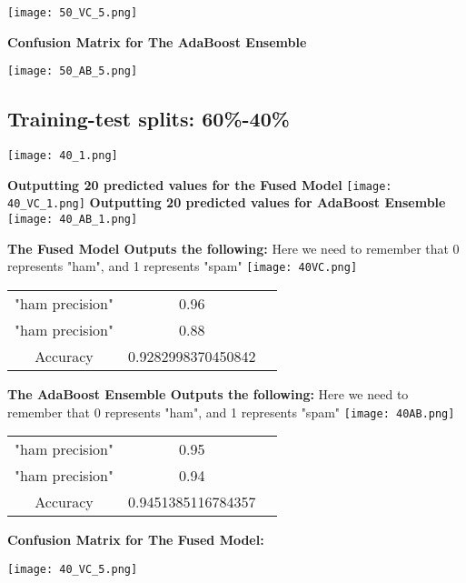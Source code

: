 \documentclass{article}
\begin{document}
\centering
\texttt{[image: 50\_VC\_5.png]}
\centering

\textbf{Confusion Matrix for The AdaBoost Ensemble}
\centering
\vspace{0.5cm}

\texttt{[image: 50\_AB\_5.png]}
\vspace{2cm}

\subsection{Training-test splits: 60\%-40\%}
\texttt{[image: 40\_1.png]}

\vspace{0.5cm}
\textbf{Outputting 20 predicted values for the Fused Model}
\texttt{[image: 40\_VC\_1.png]}
\textbf{Outputting 20 predicted values for AdaBoost Ensemble}
\texttt{[image: 40\_AB\_1.png]}

\textbf{The Fused Model Outputs the following: }
Here we need to remember that 0 represents "ham", and 1 represents "spam"
\texttt{[image: 40VC.png]}
\begin{center}
\begin{tabular}{ |c|c|c| } 
 \hline
 "ham precision" & 0.96  \\ 
 "ham precision" & 0.88 \\ 
 Accuracy  & 0.9282998370450842 \\ 
 \hline
\end{tabular}
\end{center}

\textbf{The AdaBoost Ensemble Outputs the following: }
Here we need to remember that 0 represents "ham", and 1 represents "spam"
\texttt{[image: 40AB.png]}
\begin{center}
\begin{tabular}{ |c|c|c| } 
 \hline
 "ham precision" & 0.95  \\ 
 "ham precision" & 0.94 \\ 
 Accuracy  & 0.9451385116784357 \\ 
 \hline
\end{tabular}
\end{center}
\vspace{1cm}

\centering
\textbf{Confusion Matrix for The Fused Model: }

\texttt{[image: 40\_VC\_5.png]}
\vspace{0.5cm}
\end{document}

